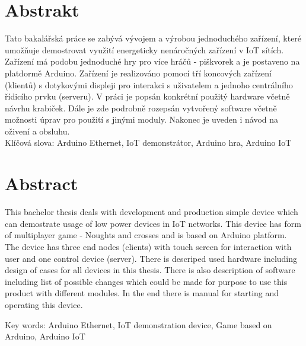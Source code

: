 \section*{Abstrakt}
Tato bakalářská práce se zabývá vývojem a výrobou jednoduchého zařízení, které umožňuje demostrovat využití energeticky nenáročných zařízení v IoT sítích. Zařízení má podobu jednoduché hry pro více hráčů - piškvorek a je postaveno na platdormě Arduino. Zařízení je realizováno pomocí tří koncových zařízení (klientů) s dotykovými displeji pro interakci s uživatelem a jednoho centrálního řídicího prvku (serveru). V práci je popsán konkrétní použitý hardware včetně návrhu krabiček. Dále je zde podrobně rozepsán vytvořený software včetně možnosti úprav pro použití s jinými moduly. Nakonec je uveden i návod na oživení a obsluhu.\\

\vspace{.5cm}
\noindent
Klíčová slova: Arduino Ethernet, IoT demonstrátor, Arduino hra, Arduino IoT



\section*{Abstract}
{
This bachelor thesis deals with development and production simple device which can demostrate usage  of low power devices in IoT networks. This device has form of multiplayer game - Noughts and crosses and is based on Arduino platform. The device has three end nodes (clients) with touch screen for interaction with user and one control device (server). There is descriped used hardware including design of cases for all devices in this thesis. There is also description of software including list of possible changes which could be made for purpose to use this product with different modules. In the end there is manual for starting and operating this device.

\vspace{.5cm}
\noindent
Key words: Arduino Ethernet, IoT demonstration device, Game based on Arduino, Arduino IoT
}
